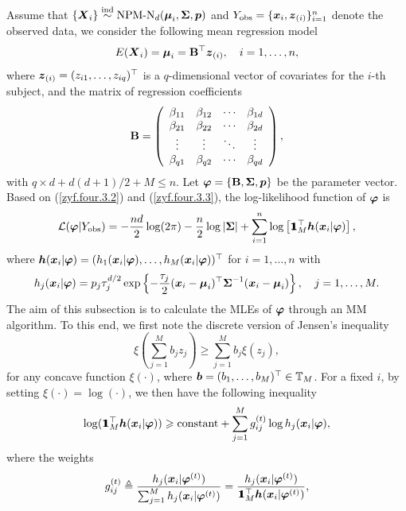 Assume that $\{{\boldsymbol{X}}_i\} \stackrel{{\rm ind}}{\sim} \mbox{NPM-N}_d({\boldsymbol{\mu}}_i, {\mbox{\boldmath$\Sigma$}}, {\boldsymbol{p}})$ and $Y_{\rm obs} = \{{\boldsymbol{x}}_i, {\boldsymbol{z}}_{(i)}\}_{i=1}^n$ denote the observed data, we consider the following mean regression model
\begin{eqnarray}    \label{zyf.four.3.3}
    E({\boldsymbol{X}}_i) = {\boldsymbol{\mu}}_i = {\bf B}^\top {\boldsymbol{z}}_{(i)}, \quad i = 1, \dots, n,
\end{eqnarray}
where ${\boldsymbol{z}}_{(i)}=(z_{i1}, \dots, z_{iq})^\top$ is a $q$-dimensional vector of covariates for the $i$-th subject, and the matrix of regression coefficients
$$
{\bf B} = \left(
\begin{array}{cccc}
  \beta_{11} & \beta_{12} & \cdots & \beta_{1d} \\
  \beta_{21} & \beta_{22} & \cdots & \beta_{2d} \\
  \vdots     & \vdots     & \ddots & \vdots \\
  \beta_{q1} & \beta_{q2} & \cdots & \beta_{qd}
\end{array}
\right),
$$
with $q \times d + d(d + 1) / 2 + M\leq n$. Let ${\mbox{\boldmath$\varphi$}} = \{{\bf B}, {\mbox{\boldmath$\Sigma$}}, {\boldsymbol{p}}\}$ be the parameter vector. Based on (\ref{zyf.four.3.2}) and (\ref{zyf.four.3.3}), the log-likelihood function of ${\mbox{\boldmath$\varphi$}}$ is
\begin{eqnarray}    \label{zyf.four.3.4}
    \mathcal{L}({\mbox{\boldmath$\varphi$}} | Y_{\rm obs}) = -\frac{nd}{2}\log(2\pi) - \frac{n}{2} \log|{\mbox{\boldmath$\Sigma$}}| + \sum_{i=1}^n \log \left[{\bf 1}\!\!\!{\bf 1}_M^\top {\boldsymbol{h}}({\boldsymbol{x}}_i | {\mbox{\boldmath$\varphi$}}) \right],
\end{eqnarray}
where ${\boldsymbol{h}}({\boldsymbol{x}}_i | {\mbox{\boldmath$\varphi$}}) = (h_1({\boldsymbol{x}}_i | {\mbox{\boldmath$\varphi$}}), \dots, h_M({\boldsymbol{x}}_i | {\mbox{\boldmath$\varphi$}}))^\top$ for $i = 1, \dots, n$ with
\begin{eqnarray}    \label{zyf.four.3.5}
    h_j({\boldsymbol{x}}_i | {\mbox{\boldmath$\varphi$}}) = p_j \tau_j^{d / 2} \exp\left\{-\frac{\tau_j}{2} ({\boldsymbol{x}}_i - {\boldsymbol{\mu}}_i)^\top {\mbox{\boldmath$\Sigma$}}^{-1} ({\boldsymbol{x}}_i - {\boldsymbol{\mu}}_i)\right\}, \quad j = 1, \dots, M.
\end{eqnarray}
The aim of this subsection is to calculate the MLEs of ${\mbox{\boldmath$\varphi$}}$ through an MM algorithm. To this end, we first note the discrete version of Jensen's inequality
$$
    \xi\left(\sum_{j=1}^M b_j z_j \right) \ge \sum_{j=1}^M b_j \xi(z_j),
$$
for any concave function $\xi(\cdot)$, where ${\boldsymbol{b}}=(b_1, \dots, b_M)^\top \in {\mathbb{T}}_{M}$. For a fixed $i$, by setting $\xi(\cdot) = \log(\cdot)$, we then have the following inequality
\begin{eqnarray}    \label{zyf.four.3.6}
   \log ({\bf 1}\!\!\!{\bf 1}_M^\top {\boldsymbol{h}}({\boldsymbol{x}}_i | {\mbox{\boldmath$\varphi$}})) \geqslant \mbox{constant} + \sum_{j=1}^M g^{(t)}_{ij} \log h_j({\boldsymbol{x}}_i | {\mbox{\boldmath$\varphi$}}),
\end{eqnarray}
where the weights
\begin{eqnarray}    \label{zyf.four.3.7}
    g^{(t)}_{ij} \triangleq \frac{h_j({\boldsymbol{x}}_i | {\mbox{\boldmath$\varphi$}}^{(t)})}{\sum_{j=1}^M h_j({\boldsymbol{x}}_i | {\mbox{\boldmath$\varphi$}}^{(t)})} = \frac{h_j({\boldsymbol{x}}_i | {\mbox{\boldmath$\varphi$}}^{(t)})}{{\bf 1}\!\!\!{\bf 1}_M^\top {\boldsymbol{h}}({\boldsymbol{x}}_i | {\mbox{\boldmath$\varphi$}}^{(t)})},
\end{eqnarray}
